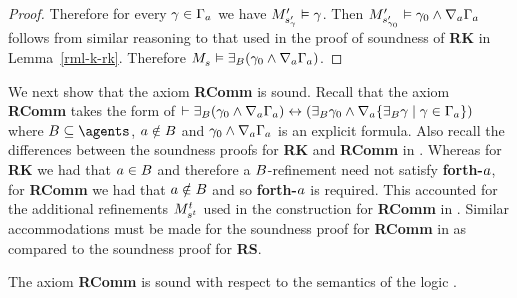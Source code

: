 \begin{proof}
Therefore for every $\gamma \in \Gamma_a$ we have ${M^{\prime}_{{s}^{\prime}_\gamma}} \vDash \gamma$.
Then ${M^{\prime}_{{s}^{\prime}_{\gamma_0}}} \vDash \gamma_0 \land \nabla_{a} \Gamma_a$ follows from similar reasoning to that used in the proof of soundness of {\bf RK} in Lemma~\ref{rml-k-rk}.
Therefore $\kPModel{\kStateS} \entails \somerefsBs (\gamma_0 \land \coversA \Gamma_\agentA)$.
\end{proof}

We next show that the axiom {\bf RComm} is sound.
Recall that the axiom {\bf RComm} takes the form of $\vdash {\exists_{B}} (\gamma_0 \land \nabla_{a} \Gamma_a) \leftrightarrow ({\exists_{B}} \gamma_0 \land \nabla_{a} \{{\exists_{B}} \gamma \mid \gamma \in \Gamma_a\})$ where $\agentsB \subseteq \agents$, $a \notin B$ and $\gamma_0 \land \nabla_{a} \Gamma_a$ is an explicit formula.
Also recall the differences between the soundness proofs for {\bf RK} and {\bf RComm} in \axiomRmlK{}.
Whereas for {\bf RK} we had that $a \in B$ and therefore a $B$-refinement need not satisfy {\bf forth-$a$}, for {\bf RComm} we had that $a \notin B$ and so {\bf forth-$a$} is required.
This accounted for the additional refinements $\kPModel[\kStateT]{\kStateS[\kStateT]}$ used in the construction for {\bf RComm} in \axiomRmlK{}.
Similar accommodations must be made for the soundness proof for {\bf RComm} in \axiomRmlS{} as compared to the soundness proof for {\bf RS}.

\begin{lemma}\label{rml-s5-rcomm}
The axiom {\bf RComm} is sound with respect to the semantics of the logic \logicRmlS{}.
\end{lemma}

